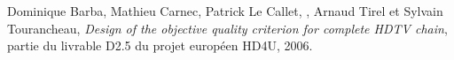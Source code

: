 

\bigskip

\noindent Dominique Barba, Mathieu Carnec, Patrick Le Callet, , Arnaud Tirel et Sylvain Tourancheau, \emph{Design of the objective quality criterion for complete HDTV chain}, partie du livrable D2.5 du projet européen HD4U, 2006.








